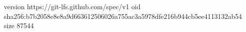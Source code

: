 version https://git-lfs.github.com/spec/v1
oid sha256:b7b2058e8e8a9d663612506026a755ac3a5978dfe216b944cb5ee4113132ab54
size 87544

